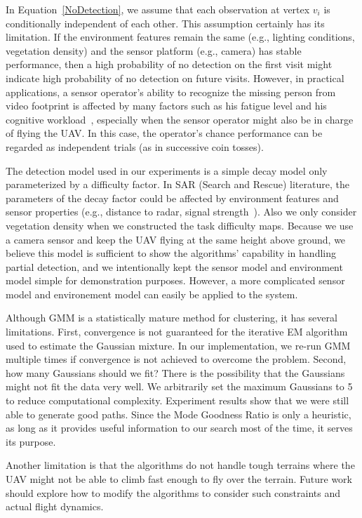 In Equation~\ref{NoDetection}, we assume that each observation at vertex $v_i$ is conditionally independent of each other. This assumption certainly has its limitation. If the environment features remain the same (e.g., lighting conditions, vegetation density) and the sensor platform (e.g., camera) has stable performance, then a high probability of no detection on the first visit might indicate high probability of no detection on future visits. However, in practical applications, a sensor operator's ability to recognize the missing person from video footprint is affected by many factors such as his fatigue level and his cognitive workload~\cite{Goodrich2008Supporting}, especially when the sensor operator might also be in charge of flying the UAV. In this case, the operator's chance performance can be regarded as independent trials (as in successive coin tosses).

The detection model used in our experiments is a simple decay model only parameterized by a difficulty factor. In SAR (Search and Rescue) literature, the parameters of the decay factor could be affected by environment features and sensor properties (e.g., distance to radar, signal strength~\cite{Bourgault2006Optimal}). Also we only consider vegetation density when we constructed the task difficulty maps. Because we use a camera sensor and keep the UAV flying at the same height above ground, we believe this model is sufficient to show the algorithms' capability in handling partial detection, and we intentionally kept the sensor model and environment model simple for demonstration purposes. However, a more complicated sensor model and environement model can easily be applied to the system. 

Although GMM is a statistically mature method for clustering, it has several limitations. First, convergence is not guaranteed for the iterative EM algorithm used to estimate the Gaussian mixture. In our implementation, we re-run GMM multiple times if convergence is not achieved to overcome the problem. Second, how many Gaussians should we fit? There is the possibility that the Gaussians might not fit the data very well. We arbitrarily set the maximum Gaussians to 5 to reduce computational complexity. Experiment results show that we were still able to generate good paths. Since the Mode Goodness Ratio is only a heuristic, as long as it provides useful information to our search most of the time, it serves its purpose.

Another limitation is that the algorithms do not handle tough terrains where the UAV might not be able to climb fast enough to fly over the terrain. Future work should explore how to modify the algorithms to consider such constraints and actual flight dynamics.

